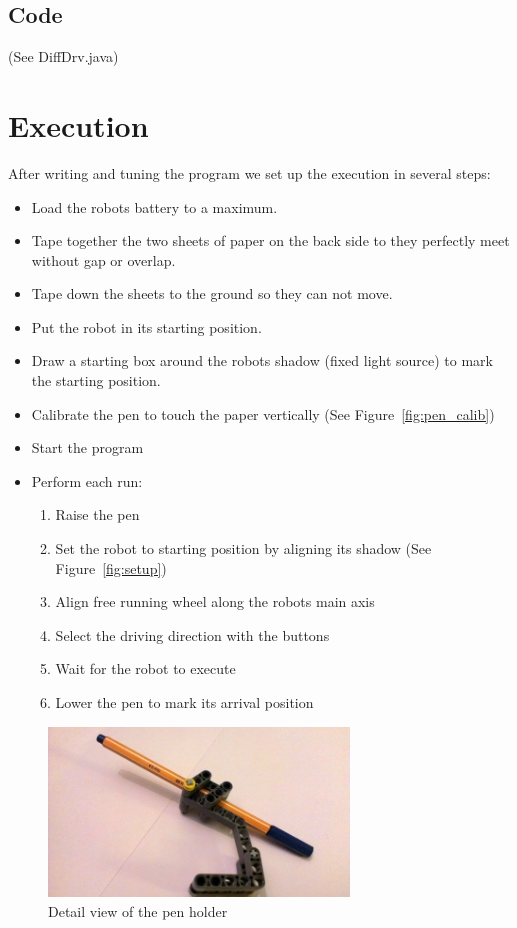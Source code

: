\documentclass{scrartcl}
\begin{document}
\subsection{Code}
(See DiffDrv.java)



\section{Execution}
After writing and tuning the program we set up the execution in several steps:
\begin{itemize}
\item Load the robots battery to a maximum.
\item Tape together the two sheets of paper on the back side to they perfectly meet without gap or overlap.
\item Tape down the sheets to the ground so they can not move.
\item Put the robot in its starting position.
\item Draw a starting box around the robots shadow (fixed light source) to mark the starting position.
\item Calibrate the pen to touch the paper vertically (See Figure~\ref{fig:pen_calib})
\item Start the program
\item Perform each run:
\begin{enumerate}
	\item Raise the pen
	\item Set the robot to starting position by aligning its shadow (See Figure~\ref{fig:setup})
	\item Align free running wheel along the robots main axis
	\item Select the driving direction with the buttons
	\item Wait for the robot to execute
	\item Lower the pen to mark its arrival position
\end{enumerate}
\end{itemize}

\begin{figure}
 \center
 \includegraphics[width= 8cm]{img/pen.jpg}
 \caption{Detail view of the pen holder}
 \label{fig:pen}
\end{figure}
\end{document}
